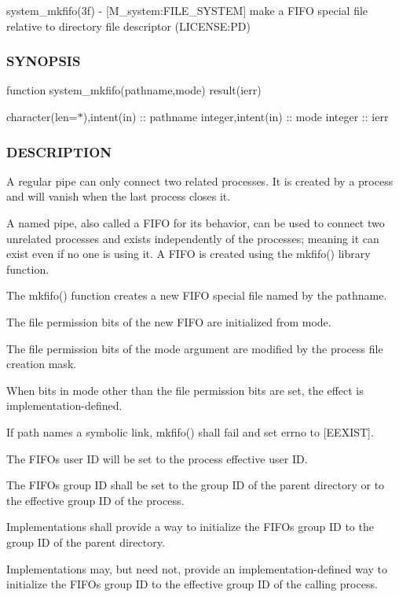 system\+\_\+mkfifo(3f) -\/ \mbox{[}M\+\_\+system\+:F\+I\+L\+E\+\_\+\+S\+Y\+S\+T\+EM\mbox{]} make a F\+I\+FO special file relative to directory file descriptor (L\+I\+C\+E\+N\+SE\+:PD) \subsubsection*{S\+Y\+N\+O\+P\+S\+IS}

function system\+\_\+mkfifo(pathname,mode) result(ierr)

character(len=$\ast$),intent(in) \+:\+: pathname integer,intent(in) \+:\+: mode integer \+:\+: ierr

\subsubsection*{D\+E\+S\+C\+R\+I\+P\+T\+I\+ON}

A regular pipe can only connect two related processes. It is created by a process and will vanish when the last process closes it.

A named pipe, also called a F\+I\+FO for its behavior, can be used to connect two unrelated processes and exists independently of the processes; meaning it can exist even if no one is using it. A F\+I\+FO is created using the mkfifo() library function.

The mkfifo() function creates a new F\+I\+FO special file named by the pathname.

The file permission bits of the new F\+I\+FO are initialized from mode.

The file permission bits of the mode argument are modified by the process\textquotesingle{} file creation mask.

When bits in mode other than the file permission bits are set, the effect is implementation-\/defined.

If path names a symbolic link, mkfifo() shall fail and set errno to \mbox{[}E\+E\+X\+I\+ST\mbox{]}.

The F\+I\+FO\textquotesingle{}s user ID will be set to the process\textquotesingle{} effective user ID.

The F\+I\+FO\textquotesingle{}s group ID shall be set to the group ID of the parent directory or to the effective group ID of the process.

Implementations shall provide a way to initialize the F\+I\+FO\textquotesingle{}s group ID to the group ID of the parent directory.

Implementations may, but need not, provide an implementation-\/defined way to initialize the F\+I\+FO\textquotesingle{}s group ID to the effective group ID of the calling process.


